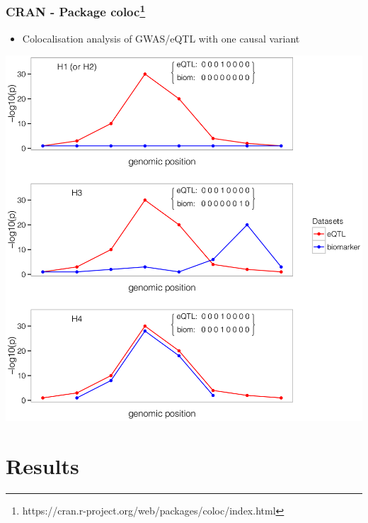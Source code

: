 \documentclass{beamer}
\begin{document}
    \begin{frame}
        \frametitle{CRAN - Package coloc\footnote{https://cran.r-project.org/web/packages/coloc/index.html}}

        \begin{itemize}
            \item Colocalisation analysis of GWAS/eQTL with one causal variant
        \end{itemize}

        \begin{center}
            \includegraphics[width=\textwidth]{../presentation_230120_gold2022_paris/fig/pgen.1004383.g001.png}
        \end{center}

    \end{frame}

    \section{Results}
\end{document}
